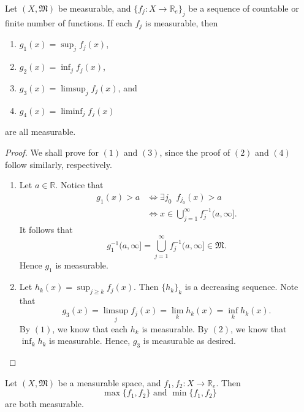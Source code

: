 \documentclass[notoc,notitlepage]{tufte-book}
\begin{document}
\begin{propo}\label{propo:extremas_supremas_and_infimas_of_measurable_functions}
  Let $(X, \mathfrak{M})$ be measurable,
  and $\{ f_j : X \to \mathbb{R}_e \}_j$ be a sequence
  of countable or finite number of functions.
  If each $f_j$ is measurable, then
  \begin{enumerate}
    \item $g_1(x) = \sup_j f_j(x)$,
    \item $g_2(x) = \inf_j f_j(x)$,
    \item $g_3(x) = \limsup_{j} f_j(x)$, and
    \item $g_4(x) = \liminf_{j} f_j(x)$
  \end{enumerate}
  are all measurable.
\end{propo}

\begin{proof}
  We shall prove for $(1)$ and $(3)$, since the proof of $(2)$ and $(4)$ follow
  similarly, respectively.
  \begin{enumerate}
    \item Let $a \in \mathbb{R}$.
      Notice that
      \begin{align*}
        g_1(x) > a
        &\iff \exists j_0\enspace f_{j_0}(x) > a \\
        &\iff x \in \bigcup_{j=1}^{\infty} f_j^{-1}(a, \infty].
      \end{align*}
      It follows that
      \begin{equation*}
        g_1^{-1}(a, \infty] = \bigcup_{j=1}^{\infty} f_j^{-1}(a, \infty]
          \in \mathfrak{M}.
      \end{equation*}
      Hence $g_1$ is measurable.

    \setcounter{enumi}{2}

    \item Let $h_k(x) = \sup_{j \geq k} f_j(x)$.
      Then $\{ h_k \}_k$ is a decreasing sequence.
      Note that
      \begin{equation*}
        g_3(x) = \limsup_{j} f_j(x) = \lim_{k} h_k(x) = \inf_k h_k(x).
      \end{equation*}
      By $(1)$, we know that each $h_k$ is measurable.
      By $(2)$, we know that $\inf_k h_k$ is measurable.
      Hence, $g_3$ is measurable as desired.
  \end{enumerate}
\end{proof}

\begin{crly}\label{crly:min_and_max_functions_are_measurablee}
  Let $(X, \mathfrak{M})$ be a measurable space, and
  $f_1, f_2 : X \to \mathbb{R}_e$.
  Then
  \begin{equation*}
    \max \{ f_1, f_2 \} \text{ and } \min \{ f_1, f_2 \}
  \end{equation*}
  are both measurable.
\end{crly}
\end{document}
